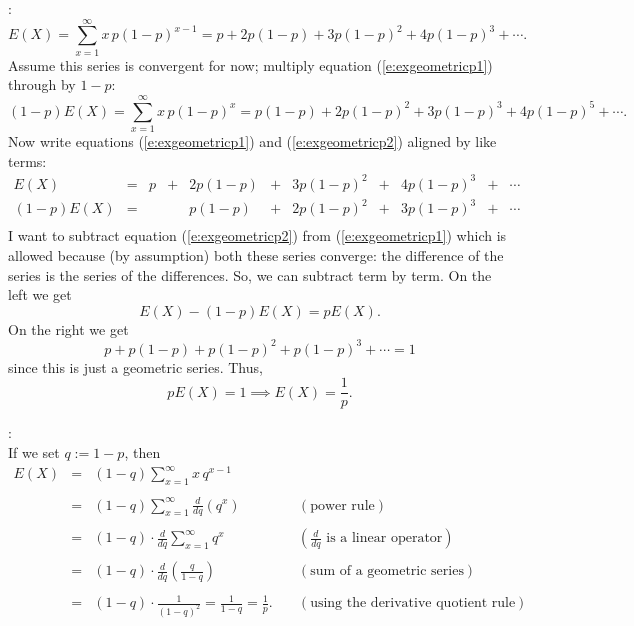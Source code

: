 \documentclass[12pt]{article}
\begin{document}
:\\
\begin{equation}
E(X) =
\sum_{x=1}^{\infty} x\, p(1-p)^{x-1} = p + 2p(1-p) + 3p(1-p)^2 + 4p(1-p)^3 + \cdots.\label{e:exgeometricp1}\end{equation}
Assume this series is convergent for now;
multiply equation (\ref{e:exgeometricp1}) through by $1-p$:
\begin{equation}
(1-p)E(X) =
\sum_{x=1}^{\infty} x\, p(1-p)^{x} = p(1-p) + 2p(1-p)^2 + 3p(1-p)^3 + 4p(1-p)^5 + \cdots.\label{e:exgeometricp2}\end{equation}
Now write equations (\ref{e:exgeometricp1}) and (\ref{e:exgeometricp2}) aligned by like terms:
$$
\begin{array}{rcrrrrrrrrr}
E(X) & = &  p & + & 2p(1-p) & + & 3p(1-p)^2 & + &  4p(1-p)^3  & + & \cdots\\
(1-p)E(X) & = &   &  & p(1-p) & + & 2p(1-p)^2 & + & 3p(1-p)^3 & + & \cdots \\
\end{array}
$$
I want to subtract equation (\ref{e:exgeometricp2}) from (\ref{e:exgeometricp1}) which is allowed
because (by assumption) both these series converge: the difference of the series is the series of the differences.
So, we can subtract term by term.  On the left we get
$$E(X) - (1-p)E(X) = pE(X).$$
On the right we get
$$p + p(1-p) + p(1-p)^2 + p(1-p)^3 + \cdots = 1$$
since this is just a geometric series. Thus,
$$pE(X)=1\implies E(X)=\frac 1p.$$

\bigskip

:\\
If we set $q:=1-p$, then
$$\displaystyle \begin{array}{rcll}
E(X) &=& (1-q)\sum_{x=1}^{\infty} x\,q^{x-1} & \\
& & & \\
&=& (1-q)\sum_{x=1}^{\infty}\frac d{dq} \left( q^{x} \right) & \quad (\mbox{power rule})\\
& & & \\
&=& (1-q)\cdot \frac d{dq} \sum_{x=1}^{\infty} q^{x} & \quad (\mbox{$\frac d{dq}$ is a linear operator})\\
& & & \\
&=& (1-q)\cdot \frac d{dq}\!\!\left( \frac q{1-q} \right) &  \quad(\mbox{sum of a geometric series})\\
& & & \\
&=& (1-q)\cdot \frac 1{(1-q)^2} = \frac 1{1-q} = \frac 1p.& \quad (\mbox{using the derivative quotient rule})\\
\end{array}$$
\end{document}
